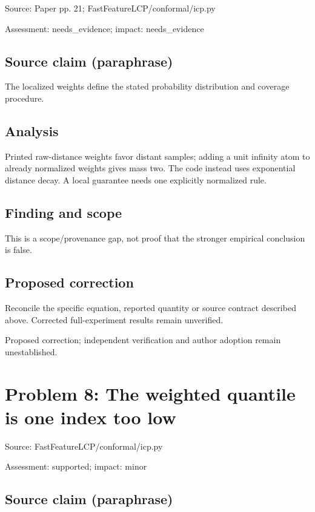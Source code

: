 \documentclass[11pt]{article}
\begin{document}
Source: Paper pp. 21; FastFeatureLCP/conformal/icp.py

Assessment: needs\_evidence; impact: needs\_evidence

\subsection*{Source claim (paraphrase)}

The localized weights define the stated probability distribution and coverage procedure.

\subsection*{Analysis}

Printed raw-distance weights favor distant samples; adding a unit infinity atom to already normalized weights gives mass two. The code instead uses exponential distance decay. A local guarantee needs one explicitly normalized rule.

\subsection*{Finding and scope}

This is a scope/provenance gap, not proof that the stronger empirical conclusion is false.

\subsection*{Proposed correction}

Reconcile the specific equation, reported quantity or source contract described above. Corrected full-experiment results remain unverified.

Proposed correction; independent verification and author adoption remain unestablished.

\section*{Problem 8: The weighted quantile is one index too low}

Source: FastFeatureLCP/conformal/icp.py

Assessment: supported; impact: minor

\subsection*{Source claim (paraphrase)}
\end{document}
